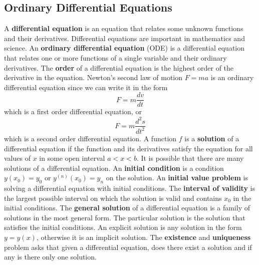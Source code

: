 \subsection{Ordinary Differential Equations}
A \textbf{differential equation} is an equation that relates some unknown
functions and their derivatives.
Differential equations are important in mathematics and science.
An \textbf{ordinary differential equation} (ODE) is a differential equation
that relates one or more functions of a single variable and their ordinary
derivatives.
The \textbf{order} of a differential equation is the highest order of the
derivative in the equation.
Newton's second law of motion \(F=ma\) is an ordinary differential
equation since we can write it in the form
\[F=m\frac{dv}{dt}\]
which is a first order differential equation, or
\[F=m\frac{d^2s}{dt^2}\]
 which is a second order differential equation.
A function \(f\) is a \textbf{solution} of a differential equation if the
function and its derivatives satisfy the equation for all values of \(x\) in
some open interval \(a<x<b\).
It is possible that there are many solutions of a differential equation.
An \textbf{initial condition} is a condition \(y(x_0)=y_0\) or
\(y^{(n)}(x_0)=y_n\) on the solution.
An \textbf{initial value problem} is solving a differential equation with initial conditions.
The \textbf{interval of validity} is the largest possible interval on which
the solution is valid and contains \(x_0\) in the initial conditions.
The \textbf{general solution} of a differential equation is a family of
solutions in the most general form.
The particular solution is the solution that satisfies the initial conditions.
An explicit solution is any solution in the form \(y=y(x)\), otherwise it is
an implicit solution.
The \textbf{existence} and \textbf{uniqueness} problem asks that given a
differential equation, does there exist a solution and if any is there only
one solution.
